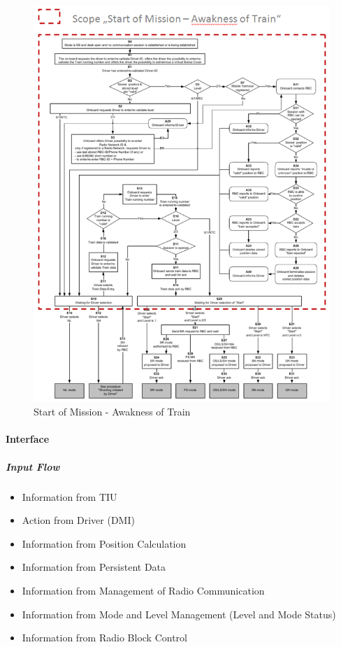 \begin{figure}
\centering
\includegraphics[scale=0.8]{images/SoMAwaknessoftrain}
\caption{Start of Mission - Awakness of Train}
\label{Start of Mission - Awakness of Train}
\end{figure}

\paragraph{Interface}
\subparagraph{Input Flow}
\begin{itemize}
\item Information from TIU
\item Action from Driver (DMI)
\item Information from Position Calculation
\item Information from Persistent Data
\item Information from Management of Radio Communication
\item Information from Mode and Level Management (Level and Mode Status)
\item Information from Radio Block Control
\end{itemize}

